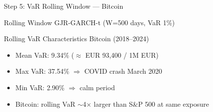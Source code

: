 \documentclass[9pt, aspectratio=169, t]{beamer}
\begin{document}
\begin{frame}{Step 5: VaR Rolling Window --- Bitcoin}
    \small
    \begin{block}{Rolling Window GJR-GARCH-t (W=500 days, VaR 1\%)}
    \end{block}
    {\small
    \begin{exampleblock}{Rolling VaR Characteristics Bitcoin (2018--2024)}
        \begin{itemize}\setlength{\itemsep}{0pt}
            \item Mean VaR: 9.34\% ($\approx$ EUR 93,400 / 1M EUR)
            \item Max VaR: 37.54\% $\Rightarrow$ COVID crash March 2020
            \item Min VaR: 2.90\% $\Rightarrow$ calm period
            \item Bitcoin: rolling VaR $\sim$4$\times$ larger than S\&P 500 at same exposure
        \end{itemize}
    \end{exampleblock}
    }
\end{frame}
\end{document}
